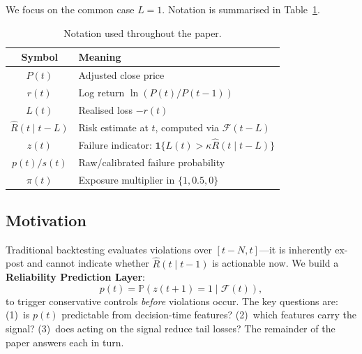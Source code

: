 \documentclass[sigconf]{acmart}
\begin{document}
We focus on the common case $L=1$. Notation is summarised in
Table~\ref{tab:notation}.

\begin{table}[t]
\caption{Notation used throughout the paper.}
\label{tab:notation}
\small
\begin{tabular}{cl}
\toprule
\textbf{Symbol} & \textbf{Meaning} \\
\midrule
$P(t)$               & Adjusted close price \\
$r(t)$               & Log return $\ln(P(t)/P(t{-}1))$ \\
$L(t)$               & Realised loss $-r(t)$ \\
$\hat{R}(t\mid t{-}L)$ & Risk estimate at $t$, computed via $\mathcal{F}(t - L)$ \\
$z(t)$               & Failure indicator: $\mathbf{1}\{L(t){>}\kappa\hat{R}(t\mid t{-}L)\}$ \\
$p(t)/s(t)$          & Raw/calibrated failure probability \\
$\pi(t)$             & Exposure multiplier in $\{1,0.5,0\}$ \\
\bottomrule
\end{tabular}
\end{table}

\subsection{Motivation}

Traditional backtesting evaluates violations over $[t{-}N,t]$---it is
inherently ex-post and cannot indicate whether $\hat{R}(t\mid t{-}1)$
is actionable now. We build a \textbf{Reliability Prediction Layer}:
\[
  p(t)=\mathbb{P}(z(t{+}1)=1\mid\mathcal{F}(t)),
\]
to trigger conservative controls \emph{before} violations occur. The
key questions are: (1)~is $p(t)$ predictable from decision-time
features? (2)~which features carry the signal? (3)~does acting on the
signal reduce tail losses? The remainder of the paper answers each in
turn.
\end{document}
